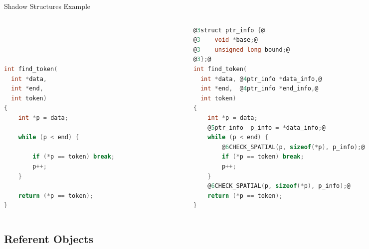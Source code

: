 \documentclass[aspectratio=169]{beamer}
\begin{document}
\begin{frame}[fragile]{Shadow Structures Example}
\begin{columns}
\begin{column}{0.42\textwidth}
\begin{lstlisting}[language=C,mathescape,basicstyle={\scriptsize\ttfamily}]




int find_token(
  int *data,
  int *end,
  int token)
{
    int *p = data;

    while (p < end) {

        if (*p == token) break;
        p++;
    }

    return (*p == token);
}
\end{lstlisting}
\end{column}

\pause

\begin{column}{0.56\textwidth}

\begin{lstlisting}[language=C,mathescape,basicstyle={\scriptsize\ttfamily},
    moredelim={**[is][{\btHL<3>}]{@3}{@}},
    moredelim={**[is][{\btHL<4>}]{@4}{@}},
    moredelim={**[is][{\btHL<5>}]{@5}{@}},
    moredelim={**[is][{\btHL<6>}]{@6}{@}},
]
@3struct ptr_info {@
@3    void *base;@
@3    unsigned long bound;@
@3};@
int find_token(
  int *data, @4ptr_info *data_info,@
  int *end,  @4ptr_info *end_info,@
  int token)
{
    int *p = data;
    @5ptr_info  p_info = *data_info;@
    while (p < end) {
        @6CHECK_SPATIAL(p, sizeof(*p), p_info);@
        if (*p == token) break;
        p++;
    }
    @6CHECK_SPATIAL(p, sizeof(*p), p_info);@
    return (*p == token);
}
\end{lstlisting}
    \end{column}
  \end{columns}
\end{frame}


\subsection{Referent Objects}
\end{document}
